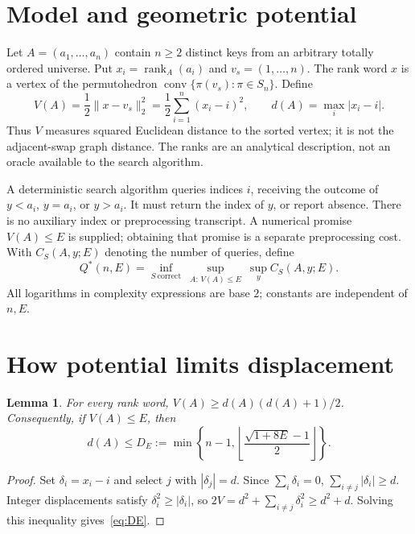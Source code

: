 \documentclass[10pt,letterpaper]{article}
\newtheorem{lemma}[theorem]{Lemma}
\newcommand{\rank}{\operatorname{rank}}
\begin{document}
\section{Model and geometric potential}
Let $A=(a_1,\ldots,a_n)$ contain $n\geq2$ distinct keys from an arbitrary totally ordered
universe. Put $x_i=\rank_A(a_i)$ and $v_s=(1,\ldots,n)$. The rank word $x$ is a vertex of
the permutohedron $\operatorname{conv}\{\pi(v_s):\pi\in S_n\}$. Define
\begin{equation}
 V(A)=\frac12\|x-v_s\|_2^2=\frac12\sum_{i=1}^n(x_i-i)^2,
 \qquad d(A)=\max_i|x_i-i|. \label{eq:potential}
\end{equation}
Thus $V$ measures squared Euclidean distance to the sorted vertex; it is not the
adjacent-swap graph distance. The ranks are an analytical description, not an oracle
available to the search algorithm.

A deterministic search algorithm queries indices $i$, receiving the outcome of
$y<a_i$, $y=a_i$, or $y>a_i$. It must return the index of $y$, or report absence.
There is no auxiliary index or preprocessing transcript. A numerical promise $V(A)\leq E$
is supplied; obtaining that promise is a separate preprocessing cost. With $C_S(A,y;E)$
denoting the number of queries, define
\begin{equation}
 Q^*(n,E)=\inf_{S\ \mathrm{correct}}\ \sup_{A:\,V(A)\leq E}\ \sup_y C_S(A,y;E).
 \label{eq:minimax}
\end{equation}
All logarithms in complexity expressions are base $2$; constants are independent of $n,E$.

\section{How potential limits displacement}
\begin{lemma}\label{lem:displacement}
For every rank word, $V(A)\geq d(A)(d(A)+1)/2$. Consequently, if $V(A)\leq E$, then
\begin{equation}
 d(A)\leq D_E:=\min\left\{n-1,\left\lfloor\frac{\sqrt{1+8E}-1}{2}\right\rfloor\right\}.
 \label{eq:DE}
\end{equation}
\end{lemma}
\begin{proof}
Set $\delta_i=x_i-i$ and select $j$ with $|\delta_j|=d$. Since $\sum_i\delta_i=0$,
$\sum_{i\ne j}|\delta_i|\geq d$. Integer displacements satisfy $\delta_i^2\geq|\delta_i|$,
so $2V=d^2+\sum_{i\ne j}\delta_i^2\geq d^2+d$. Solving this inequality gives~\eqref{eq:DE}.
\end{proof}
\end{document}
